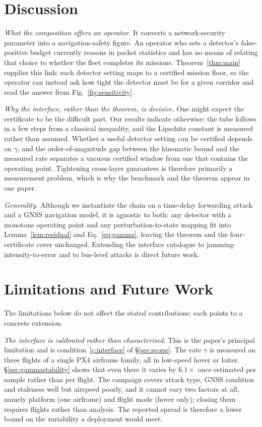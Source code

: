 \section{Discussion}
\label{sec:discussion}
\emph{What the composition offers an operator.} It converts a network-security
parameter into a navigation-safety figure. An operator who sets a detector's
false-positive budget currently reasons in packet statistics and has no means of
relating that choice to whether the fleet completes its missions.
Theorem~\ref{thm:main} supplies this link: each detector setting maps to a
certified mission floor, so the operator can instead ask how tight the detector
must be for a given corridor and read the answer from Fig.~\ref{fig:sensitivity}.

\emph{Why the interface, rather than the theorem, is decisive.} One might expect
the certificate to be the difficult part. Our results indicate otherwise: the
tube follows in a few steps from a classical inequality, and the Lipschitz
constant is measured rather than assumed. Whether a useful detector setting can
be certified depends on $\gamma$, and the order-of-magnitude gap between the
kinematic bound and the measured rate separates a vacuous certified window from
one that contains the operating point. Tightening cross-layer guarantees is
therefore primarily a measurement problem, which is why the benchmark and the
theorem appear in one paper.

\emph{Generality.} Although we instantiate the chain on a time-delay forwarding
attack and a GNSS navigation model, it is agnostic to both: any detector with a
monotone operating point and any perturbation-to-state mapping fit into
Lemma~\ref{lem:residual} and Eq.~\eqref{eq:gamma}, leaving the theorem and the
four-certificate cover unchanged. Extending the interface catalogue to
jamming-intensity-to-error and to bus-level attacks is direct future
work.

\section{Limitations and Future Work}
\label{sec:limitations}
The limitations below do not affect the stated contributions; each points to a
concrete extension.

\emph{The interface is calibrated rather than characterised.} This is the
paper's principal limitation and is condition~\ref{c:interface} of
\S\ref{sec:scope}. The rate $\gamma$ is measured
on three flights of a single PX4 airframe family, all in low-speed hover or
loiter. \S\ref{sec:gammastability} shows that even there it varies by $6.1\times$
once estimated per sample rather than per flight. The campaign covers attack type, GNSS condition and staleness well
but airspeed poorly, and it cannot vary two factors at all, namely platform (one
airframe) and flight mode (hover only); closing them requires
flights rather than analysis. The reported spread is therefore a lower
bound on the variability a deployment would meet.

